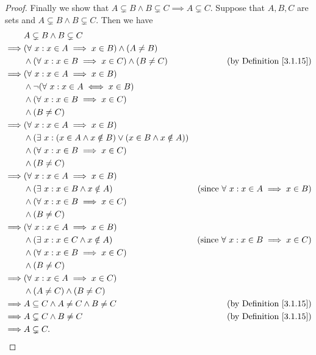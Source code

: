 \begin{proof}
Finally we show that \(A \subsetneq B \land B \subsetneq C \implies A \subsetneq C\).
Suppose that \(A, B, C\) are sets and \(A \subsetneq B \land B \subsetneq C\).
Then we have
\begin{align*}
& A \subsetneq B \land B \subsetneq C \\
\implies & (\forall\ x : x \in A \implies x \in B) \land (A \neq B) \\
& \land (\forall\ x : x \in B \implies x \in C) \land (B \neq C) & \text{(by Definition \ref{3.1.15})} \\
\implies & (\forall\ x : x \in A \implies x \in B) \\
& \land \lnot(\forall\ x : x \in A \iff x \in B) \\
& \land (\forall\ x : x \in B \implies x \in C) \\
& \land (B \neq C) \\
\implies & (\forall\ x : x \in A \implies x \in B) \\
& \land (\exists\ x : (x \in A \land x \notin B) \lor (x \in B \land x \notin A)) \\
& \land (\forall\ x : x \in B \implies x \in C) \\
& \land (B \neq C) \\
\implies & (\forall\ x : x \in A \implies x \in B) \\
& \land (\exists\ x : x \in B \land x \notin A) & \text{(since \(\forall\ x : x \in A \implies x \in B\))} \\
& \land (\forall\ x : x \in B \implies x \in C) \\
& \land (B \neq C) \\
\implies & (\forall\ x : x \in A \implies x \in B) \\
& \land (\exists\ x : x \in C \land x \notin A) & \text{(since \(\forall\ x : x \in B \implies x \in C\))} \\
& \land (\forall\ x : x \in B \implies x \in C) \\
& \land (B \neq C) \\
\implies & (\forall\ x : x \in A \implies x \in C) \\
& \land (A \neq C) \land (B \neq C) \\
\implies & A \subseteq C \land A \neq C \land B \neq C & \text{(by Definition \ref{3.1.15})} \\
\implies & A \subsetneq C \land B \neq C & \text{(by Definition \ref{3.1.15})} \\
\implies & A \subsetneq C.
\end{align*}
\end{proof}

